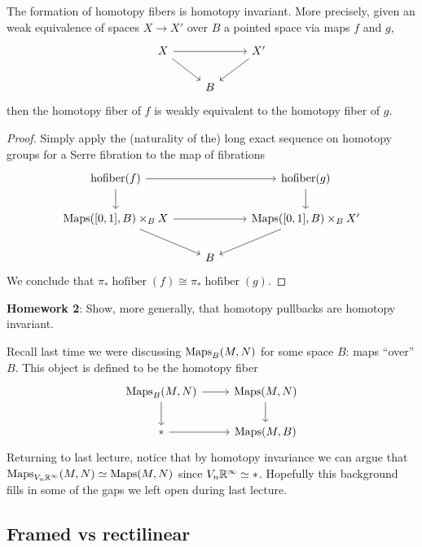 \documentclass{amsart}
\DeclareMathOperator{\hofiber}{hofiber}
\begin{document}
\begin{lemma}
    The formation of homotopy fibers is homotopy invariant. More precisely, given an weak
    equivalence of spaces $X\to X'$ over $B$ a pointed space via maps $f$ and $g$,
    \begin{equation*}
        \begin{tikzcd}
            X \ar[rr]\ar[rd]{f} &  & X'\ar[ld]{g} \\
            & B &
        \end{tikzcd}
    \end{equation*}
    then the homotopy fiber of $f$ is weakly equivalent to the homotopy fiber of $g$.
\end{lemma}
\begin{proof}
    Simply apply the (naturality of the) long exact sequence on homotopy groups for a
    Serre fibration to the map of fibrations 
    \begin{equation*}
        \begin{tikzcd}
            \hofiber(f)\dar \ar[rr] & \; & \hofiber(g)\dar \\
            \Maps([0,1],B)\times_B X \ar[rr]\drar & \; & \Maps([0,1],B)\times_B X'\ar[dl] \\
            \; & B & 
        \end{tikzcd}
    \end{equation*}
    We conclude that $\pi_*\hofiber(f)\cong\pi_*\hofiber(g)$.
\end{proof}

\textbf{Homework 2}: Show, more generally, that homotopy pullbacks are homotopy invariant.

Recall last time we were discussing $\operatorname{Maps}_B(M,N)$ for some space $B$: maps ``over'' $B$.
This object is defined to be the homotopy fiber
\begin{equation*}
    \begin{tikzcd}
        \Maps_B(M,N) \rar\dar & \Maps(M,N) \dar \\
        * \rar & \Maps(M,B)
    \end{tikzcd}
\end{equation*}
Returning to last lecture, notice that by homotopy invariance we can argue that
$\operatorname{Maps}_{V_n\mathbb{R}^\infty}(M,N)\simeq \operatorname{Maps}(M,N)$ since $V_n\mathbb{R}^\infty\simeq*$.
Hopefully this background fills in some of the gaps we left open during last lecture.

\subsection{Framed vs rectilinear}
\end{document}
